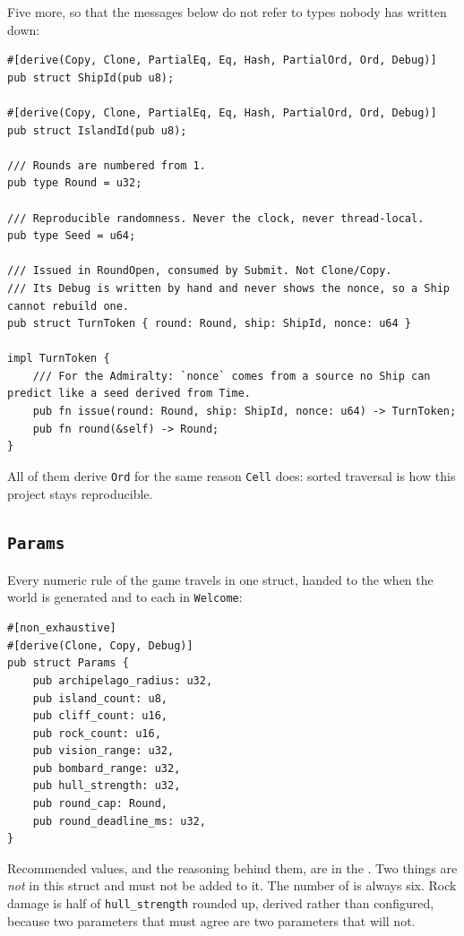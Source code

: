 \documentclass{article}
\begin{document}
Five more, so that the messages below do not refer to types nobody has written down:

\begin{lstlisting}
#[derive(Copy, Clone, PartialEq, Eq, Hash, PartialOrd, Ord, Debug)]
pub struct ShipId(pub u8);

#[derive(Copy, Clone, PartialEq, Eq, Hash, PartialOrd, Ord, Debug)]
pub struct IslandId(pub u8);

/// Rounds are numbered from 1.
pub type Round = u32;

/// Reproducible randomness. Never the clock, never thread-local.
pub type Seed = u64;

/// Issued in RoundOpen, consumed by Submit. Not Clone/Copy.
/// Its Debug is written by hand and never shows the nonce, so a Ship cannot rebuild one.
pub struct TurnToken { round: Round, ship: ShipId, nonce: u64 }

impl TurnToken {
    /// For the Admiralty: `nonce` comes from a source no Ship can predict like a seed derived from Time.
    pub fn issue(round: Round, ship: ShipId, nonce: u64) -> TurnToken;
    pub fn round(&self) -> Round;
}

\end{lstlisting}

All of them derive \texttt{Ord} for the same reason \texttt{Cell} does: sorted traversal is how
this project stays reproducible.

\subsection{\texttt{Params}}
\label{proto:params}

Every numeric rule of the game travels in one struct, handed to the \chart{} when the world is
generated and to each \ship{} in \texttt{Welcome}:

\begin{lstlisting}
#[non_exhaustive]
#[derive(Clone, Copy, Debug)]
pub struct Params {
    pub archipelago_radius: u32,
    pub island_count: u8,
    pub cliff_count: u16,
    pub rock_count: u16,
    pub vision_range: u32,
    pub bombard_range: u32,
    pub hull_strength: u32,
    pub round_cap: Round,
    pub round_deadline_ms: u32,
}
\end{lstlisting}

Recommended values, and the reasoning behind them, are in the \MD. Two things are \emph{not} in
this struct and must not be added to it. The number of \ships{} is always six. Rock damage is
half of \texttt{hull\_strength} rounded up, derived rather than configured, because two parameters
that must agree are two parameters that will not.
\end{document}
